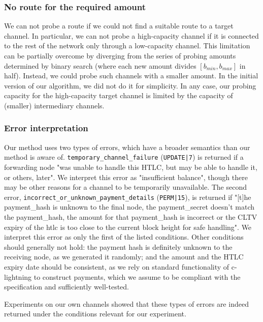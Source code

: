 \subsubsection*{No route for the required amount}

We can not probe a route if we could not find a suitable route to a target channel.
In particular, we can not probe a high-capacity channel if it is connected to the rest of the network only through a low-capacity channel.
This limitation can be partially overcome by diverging from the series of probing amounts determined by binary search (where each new amount divides $[b_{min}, b_{max}]$ in half).
Instead, we could probe such channels with a smaller amount.
In the initial version of our algorithm, we did not do it for simplicity.
In any case, our probing capacity for the high-capacity target channel is limited by the capacity of (smaller) intermediary channels.

\subsubsection*{Error interpretation}

Our method uses two types of errors, which have a broader semantics than our method is aware of.
\texttt{temporary\_channel\_failure} (\texttt{UPDATE|7}) is returned if a forwarding node "was unable to handle this HTLC, but may be able to handle it, or others, later".
We interpret this error as "insufficient balance", though there may be other reasons for a channel to be temporarily unavailable.
The second error, \texttt{incorrect\_or\_unknown\_payment\_details} (\texttt{PERM|15}), is returned if "[t]he payment\_hash is unknown to the final node, the payment\_secret doesn't match the payment\_hash, the amount for that payment\_hash is incorrect or the CLTV expiry of the htlc is too close to the current block height for safe handling".
We interpret this error as only the first of the listed conditions.
Other conditions should generally not hold: the payment hash is definitely unknown to the receiving node, as we generated it randomly; and the amount and the HTLC expiry date should be consistent, as we rely on standard functionality of c-lightning to construct payments, which we assume to be compliant with the specification and sufficiently well-tested.

Experiments on our own channels showed that these types of errors are indeed returned under the conditions relevant for our experiment.


